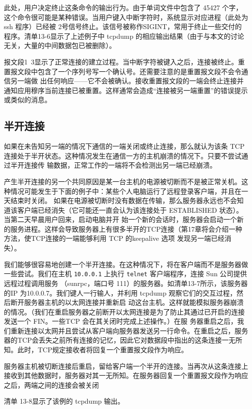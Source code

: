 此处，用户决定终止这条命令的输出行为。由于单词文件中包含了 45427 个字，这个命令很可能是某种错误。当用户键入中断字符时，系统显示对应进程（此处为 ssh 程序）已经被
2号信号终止。该信号被称作SIGINT，常用于终止一些交付的程序。清单13-6显示了上述例子中 tcpdump 的相应输出结果（由于与本文的讨论无关，大量的中间数据包已被删除）。

报文段1~3显示了正常连接的建立过程。当中断字符被键入之后，连接被终止。重置报文段中包含了一个序列号写一个确认号。还需要注意的是重置报文段不会令通信另一端做
出任何响应——它不会被确认。接收重置报文段的一端会终止连接并通知应用穆序当前连接已被重置。这样通常会造成“连接被另一端重置”的错误提示或类似的消息。
\subsection{半开连接}
如果在未告知另一端的情况下通信的一端关闭或终止连接，那么就认为该条 TCP 连接处于半开状态。这种情况发生在通信一方的主机崩溃的情况下。只要不尝试通过半开连接传
输数据，正常工作的一端将不会检测出另一端已经崩溃。

产生半开连接的另一个共同原因是某一台主机的电源被切断而不是被正常关机。这种情况可能发生于下面的例子中：某些个人电脑运行了远程登录客户端，并且在一天结束时关闭。
如果在电源被切断时没有数据在传输，那么服务器永远也不会知道该客户端已经消失（它可能还一直会认为该连接处于 ESTABLISHED 状态）。当第二天早晨用户回来，启动电脑并开
始一个新的会话时，服务器会启动一个新的服务进程。这样会导致服务器上有很多半开的TCP连接（第17章将会介绍一种方法，使TCP连接的一端能够利用 TCP 的keepalive 选项
发现另一端已经消失）。

我们能够很容易地创建一个半开连接。在这种情况下，将在客户端而不是服务器做一些尝试。我们在主机 \verb|10.0.0.1| 上执行 \verb|telnet| 客户端程序，连接 Sun 公司提供远程过程调用服务
（sunrpc，端口号 111）的服务器。如清单13-7所示，该服务器的IP 为10.0.0.7。我们键人一行输人，并利用 tcpdump 观察它们的交互过程，然后断开服务器主机的以太网连接并重新启
动这台主机。这样就能模拟服务器崩溃的情况。（我们在重启服务器之前断开以太网连接是为了防止其通过已开启的连接发送一个 FIN。一些TCP 会在其关闭时完成上述操作。）在服
务器重启之后，我们重新连接以太网并且尝试从客户端向服务器发送另一行命令。在重启之后，服务器的TCP会丢失之前所有连接的记忆，因此它对数据段中指出的这条连接一无所
知。此时，TCP规定接收者将回复一个重置报文段作为响应。

服务器主机被切断连接后重启，留给客户端一个半开的连接。当再次从这条连接上接收到其他数据时，服务器对其一无所知。在服务器回复一个重置报文段作为响应之后，两端之间的连接会被关闭

清单 13-8显示了该例的 tcpdump 输出。

